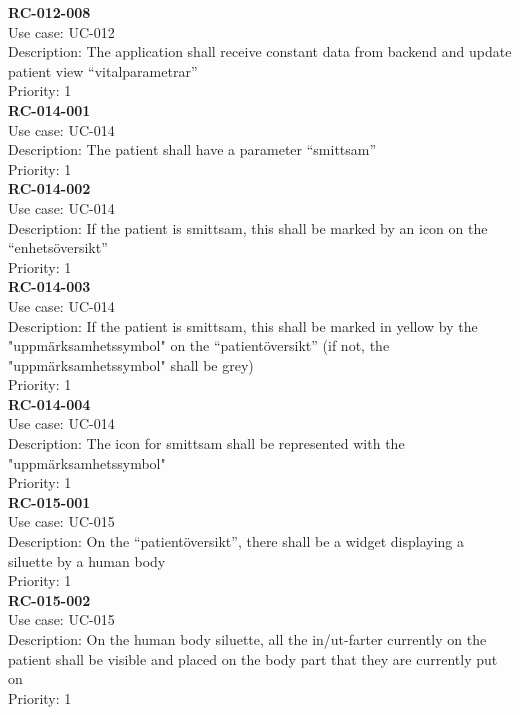 \textbf{RC-012-008} \\
Use case: UC-012 \\
Description: The application shall receive constant data from backend and update patient view “vitalparametrar”  \\
Priority: 1 \\
\newline
\textbf{RC-014-001} \\
Use case: UC-014 \\
Description: The patient shall have a parameter “smittsam” \\
Priority: 1 \\
\newline
\textbf{RC-014-002} \\
Use case: UC-014 \\
Description: If the patient is smittsam, this shall be marked by an icon on the “enhetsöversikt” \\
Priority: 1 \\
\newline
\textbf{RC-014-003} \\
Use case: UC-014 \\
Description: If the patient is smittsam, this shall be marked in yellow by the "uppmärksamhetssymbol" on the “patientöversikt” (if not, the "uppmärksamhetssymbol" shall be grey) \\
Priority: 1 \\
\newline
\textbf{RC-014-004} \\
Use case: UC-014 \\
Description: The icon for smittsam shall be represented with the "uppmärksamhetssymbol" \\
Priority: 1 \\
\newline
\textbf{RC-015-001} \\
Use case: UC-015 \\
Description: On the “patientöversikt”, there shall be a widget displaying a siluette by a human body  \\
Priority: 1 \\
\newline
\textbf{RC-015-002} \\
Use case: UC-015 \\
Description: On the human body siluette, all the in/ut-farter currently on the patient shall be visible and placed on the body part that they are currently put on \\
Priority: 1 \\
